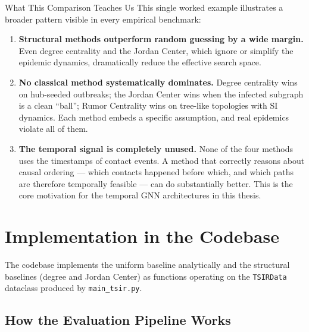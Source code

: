 \begin{conceptbox}{What This Comparison Teaches Us}
This single worked example illustrates a broader pattern visible in every empirical
benchmark:

\begin{enumerate}
  \item \textbf{Structural methods outperform random guessing by a wide margin.} Even
        degree centrality and the Jordan Center, which ignore or simplify the epidemic
        dynamics, dramatically reduce the effective search space.

  \item \textbf{No classical method systematically dominates.} Degree centrality wins
        on hub-seeded outbreaks; the Jordan Center wins when the infected subgraph is
        a clean ``ball''; Rumor Centrality wins on tree-like topologies with SI
        dynamics. Each method embeds a specific assumption, and real epidemics violate
        all of them.

  \item \textbf{The temporal signal is completely unused.} None of the four methods
        uses the timestamps of contact events. A method that correctly reasons about
        causal ordering --- which contacts happened before which, and which paths are
        therefore temporally feasible --- can do substantially better. This is the core
        motivation for the temporal GNN architectures in this thesis.
\end{enumerate}
\end{conceptbox}

\section{Implementation in the Codebase}
\label{sec:classical-code}

The codebase implements the uniform baseline analytically and the structural baselines
(degree and Jordan Center) as functions operating on the \texttt{TSIRData} dataclass
produced by \texttt{main\_tsir.py}.

\subsection{How the Evaluation Pipeline Works}

